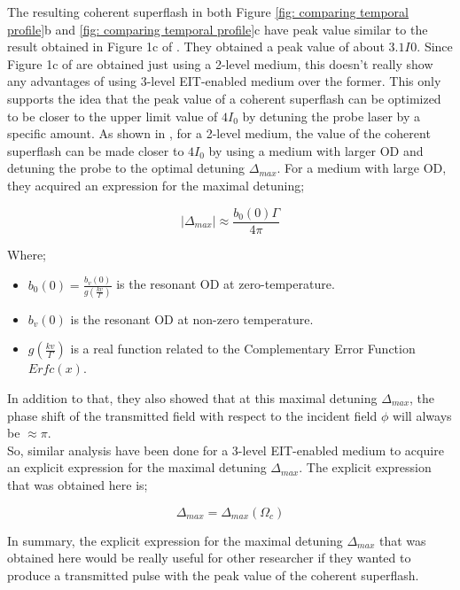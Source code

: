 The resulting coherent superflash in both Figure \ref{fig: comparing temporal profile}b and \ref{fig: comparing temporal profile}c have peak value similar to the result obtained in Figure 1c of \cite{Kwong2014}. They obtained a peak value of about $3.1 I_{}0$. Since Figure 1c of \cite{Kwong2014} are obtained just using a 2-level medium, this doesn't really show any advantages of using 3-level EIT-enabled medium over the former. This only supports the idea that the peak value of a coherent superflash can be optimized to be closer to the upper limit value of $4I_{0}$ by detuning the probe laser by a specific amount. As shown in \cite{Kwong2014}, for a 2-level medium, the value of the coherent superflash can be made closer to $4I_{0}$ by using a medium with larger OD and detuning the probe to the optimal detuning $\Delta_{max}$. For a medium with large OD, they acquired an expression for the maximal detuning;

\begin{equation}
    |\Delta_{max}| \approx \frac{b_{0}(0) \Gamma}{4\pi} 
\end{equation}

Where;

\begin{itemize}
    \item $b_{0}(0) = \frac{b_{v}(0)}{g(\frac{kv}{\Gamma})}$ is the resonant OD at zero-temperature. 
    \item $b_{v}(0)$ is the resonant OD at non-zero temperature.
    \item $g(\frac{kv}{\Gamma})$ is a real function related to the Complementary Error Function $Erfc(x)$.
\end{itemize}

In addition to that, they also showed that at this maximal detuning $\Delta_{max}$, the phase shift of the transmitted field with respect to the incident field $\phi$ will always be $\approx \pi$.\\

So, similar analysis have been done for a 3-level EIT-enabled medium to acquire an explicit expression for the maximal detuning $\Delta_{max}$. The explicit expression that was obtained here is;

\begin{equation}
    \Delta_{max} = \Delta_{max}(\Omega_{c})
\end{equation}


In summary, the explicit expression for the maximal detuning $\Delta_{max}$ that was obtained here would be really useful for other researcher if they wanted to produce a transmitted pulse with the peak value of the coherent superflash.


